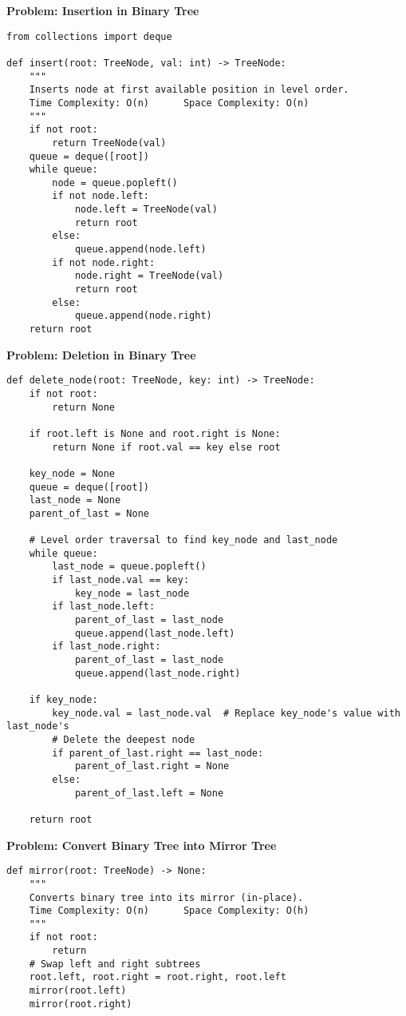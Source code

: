 \noindent\textbf{Problem: Insertion in Binary Tree}
\begin{verbatim}
from collections import deque

def insert(root: TreeNode, val: int) -> TreeNode:
    """
    Inserts node at first available position in level order.
    Time Complexity: O(n)      Space Complexity: O(n)
    """
    if not root:
        return TreeNode(val)
    queue = deque([root])
    while queue:
        node = queue.popleft()
        if not node.left:
            node.left = TreeNode(val)
            return root
        else:
            queue.append(node.left)
        if not node.right:
            node.right = TreeNode(val)
            return root
        else:
            queue.append(node.right)
    return root
\end{verbatim}
\noindent\textbf{Problem: Deletion in Binary Tree}
\begin{verbatim}
def delete_node(root: TreeNode, key: int) -> TreeNode:
    if not root:
        return None

    if root.left is None and root.right is None:
        return None if root.val == key else root

    key_node = None
    queue = deque([root])
    last_node = None
    parent_of_last = None

    # Level order traversal to find key_node and last_node
    while queue:
        last_node = queue.popleft()
        if last_node.val == key:
            key_node = last_node
        if last_node.left:
            parent_of_last = last_node
            queue.append(last_node.left)
        if last_node.right:
            parent_of_last = last_node
            queue.append(last_node.right)

    if key_node:
        key_node.val = last_node.val  # Replace key_node's value with last_node's
        # Delete the deepest node
        if parent_of_last.right == last_node:
            parent_of_last.right = None
        else:
            parent_of_last.left = None

    return root
\end{verbatim}
\noindent\textbf{Problem: Convert Binary Tree into Mirror Tree}
\begin{verbatim}
def mirror(root: TreeNode) -> None:
    """
    Converts binary tree into its mirror (in-place).
    Time Complexity: O(n)      Space Complexity: O(h)
    """
    if not root:
        return
    # Swap left and right subtrees
    root.left, root.right = root.right, root.left
    mirror(root.left)
    mirror(root.right)
\end{verbatim}
